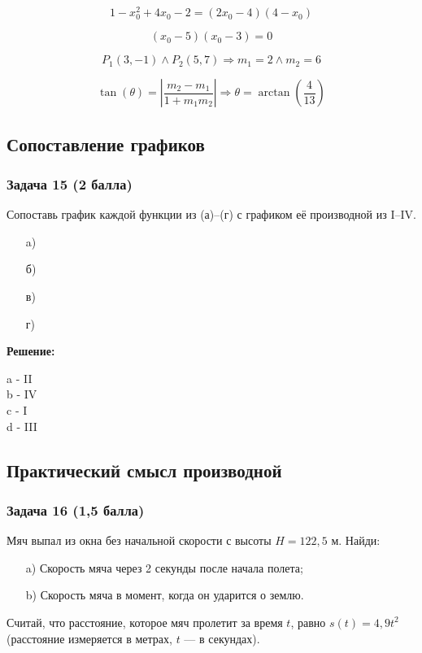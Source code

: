 \documentclass[a4paper,12pt]{article}
\begin{document}
\[
1-x_0^2+4x_0 - 2 = (2x_0-4)(4-x_0)
\]

\[
(x_0-5)(x_0-3)=0
\]

\[
P_1(3, -1) \land P_2(5, 7) \Rightarrow m_1 = 2 \land m_2 = 6
\]

\[
\tan(\theta) = \left| \frac{m_2-m_1}{1+m_1m_2} \right| \Rightarrow \theta = \arctan(\frac{4}{13})
\]

\vspace{1cm}

\subsection{Сопоставление графиков}

\subsubsection{Задача 15 (2 балла)}
Сопоставь график каждой функции из (а)–(г) с графиком её производной из I–IV.
\begin{enumerate}
    \item[a)]
    \item[б)]
    \item[в)]
    \item[г)]
\end{enumerate}


\textbf{Решение:}

a - II\\

b - IV\\

c - I\\

d - III\\

\vspace{1cm}

\subsection{Практический смысл производной}

\subsubsection{Задача 16 (1,5 балла)}
Мяч выпал из окна без начальной скорости с высоты \( H = 122{,}5 \) м. Найди:
\begin{enumerate}
    \item[a)] Скорость мяча через 2 секунды после начала полета;
    \item[b)] Скорость мяча в момент, когда он ударится о землю.
\end{enumerate}
Считай, что расстояние, которое мяч пролетит за время \( t \), равно \( s(t) = 4{,}9 t^2 \) (расстояние измеряется в метрах, \( t \) — в секундах).
\end{document}
